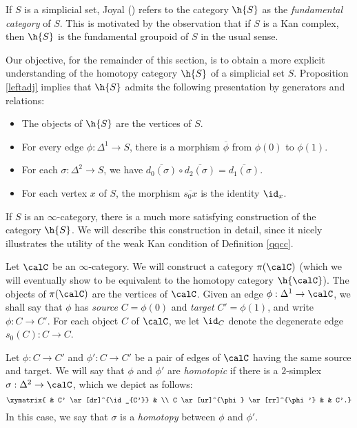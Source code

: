 \begin{remark}
If $S$ is a simplicial set, Joyal (\cite{joyalnotpub}) refers to the category $\h{S}$ as the {\it fundamental
category} of $S$. This is motivated by the observation that if $S$ is a Kan complex, then $\h{S}$ is
the fundamental groupoid of $S$ in the usual sense.
\end{remark}

Our objective, for the remainder of this section, is to obtain a more explicit understanding of
the homotopy category $\h{S}$ of a simplicial set $S$. Proposition \ref{leftadj} implies that $\h{S}$ 
admits the following presentation by generators and relations:

\begin{itemize}
\item The objects of $\h{S}$ are the vertices of $S$.

\item For every edge $\phi: \Delta^1 \rightarrow S$, there is a morphism $\overline{\phi}$ from
$\phi(0)$ to $\phi(1)$.

\item For each $\sigma: \Delta^2 \rightarrow S$, we have $\overline{d_0(\sigma)} \circ \overline{d_2(\sigma)} = \overline{d_1(\sigma)}$.

\item For each vertex $x$ of $S$, the morphism $\overline{s_0 x}$ is the identity $\id_x$. 
\end{itemize}

If $S$ is an $\infty$-category, there is a much more satisfying construction of the category $\h{S}$.
We will describe this construction in detail, since it nicely illustrates the utility of the weak Kan condition of Definition \ref{qqcc}.

Let $\calC$ be an $\infty$-category. We will construct a category $\pi(\calC)$
(which we will eventually show to be equivalent to the homotopy category $\h{\calC}$). The objects of $\pi(\calC)$ are the vertices of $\calC$. Given an
edge $\phi: \Delta^1 \rightarrow \calC$, we shall say that $\phi$ has {\it source}
$C= \phi(0)$ and {\it target} $C' = \phi(1) $, and write $\phi:
C \rightarrow C'$. For each object $C$ of $\calC$, we
let $\id_{C}$ denote the degenerate edge $s_0(C): C \rightarrow C$.

Let $\phi: C \rightarrow C'$ and $\phi': C \rightarrow C'$ be a pair of edges of $\calC$ having
the same source and target. We will say that $\phi$ and $\phi'$ are {\it homotopic} if
there is a $2$-simplex $\sigma: \Delta^2 \rightarrow \calC$, which we depict as follows:
$$ \xymatrix{
& C' \ar[dr]^{\id_{C'}} & \\
C \ar[ur]^{\phi} \ar[rr]^{\phi'} & & C'.}$$
In this case, we say that $\sigma$ is a {\it homotopy} between $\phi$ and $\phi'$.

